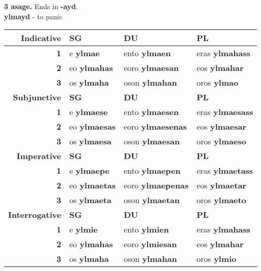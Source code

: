 \documentclass{book}
\begin{document}
\begin{center}
  \textbf{3 asage.} Ends in \textbf{-ayd}. \\
  \textbf{ylmayd} - to panic \\
  \begin{tabular}{|r|l|l|l|}
    \hline
    \textbf{Indicative} & \textbf{SG} & \textbf{DU} & \textbf{PL} \\ \hline
    \textbf{1} & e \textbf{ylmae} & ento \textbf{ylmaen} & eras \textbf{ylmahass} \\ \hline
    \textbf{2} & eo \textbf{ylmahas} & eoro \textbf{ylmaesan} & eos \textbf{ylmahar} \\ \hline
    \textbf{3} & os \textbf{ylmaha} & oson \textbf{ylmahan} & oros \textbf{ylmao} \\ \hline
    \textbf{Subjunctive} & \textbf{SG} & \textbf{DU} & \textbf{PL} \\ \hline
    \textbf{1} & e \textbf{ylmaese} & ento \textbf{ylmaesen} & eras \textbf{ylmaesass} \\ \hline
    \textbf{2} & eo \textbf{ylmaesas} & eoro \textbf{ylmaesenas} & eos \textbf{ylmaesar} \\ \hline
    \textbf{3} & os \textbf{ylmaesa} & oson \textbf{ylmaesan} & oros \textbf{ylmaeso} \\ \hline
    \textbf{Imperative} & \textbf{SG} & \textbf{DU} & \textbf{PL} \\ \hline
    \textbf{1} & e \textbf{ylmaepe} & ento \textbf{ylmaepen} & eras \textbf{ylmaetass} \\ \hline
    \textbf{2} & eo \textbf{ylmaetas} & eoro \textbf{ylmaepenas} & eos \textbf{ylmaetar} \\ \hline
    \textbf{3} & os \textbf{ylmaeta} & oson \textbf{ylmaetan} & oros \textbf{ylmaeto} \\ \hline
    \textbf{Interrogative} & \textbf{SG} & \textbf{DU} & \textbf{PL} \\ \hline
    \textbf{1} & e \textbf{ylmie} & ento \textbf{ylmien} & eras \textbf{ylmahass} \\ \hline
    \textbf{2} & eo \textbf{ylmahas} & eoro \textbf{ylmiesan} & eos \textbf{ylmahar} \\ \hline
    \textbf{3} & os \textbf{ylmaha} & oson \textbf{ylmahan} & oros \textbf{ylmio} \\ \hline
  \end{tabular}

  \pagebreak


\end{center}
\end{document}
